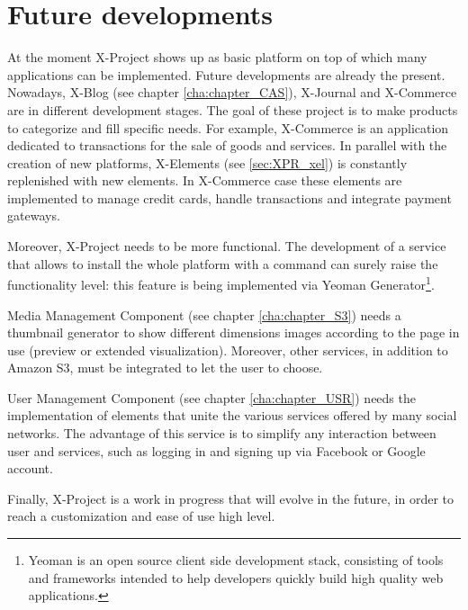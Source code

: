 \section{Future developments}
\label{sec:conclusions_future_developments_a}

At the moment X-Project shows up as basic platform on top of which many applications can be implemented. Future developments are already the present. Nowadays, X-Blog (see chapter \ref{cha:chapter_CAS}), X-Journal and X-Commerce are in different development stages. The goal of these project is to make products to categorize and fill specific needs. For example, X-Commerce is an application dedicated to transactions for the sale of goods and services. In parallel with the creation of new platforms, X-Elements (see \ref{sec:XPR_xel}) is constantly replenished with new elements.
In X-Commerce case these elements are implemented to manage credit cards, handle transactions and integrate payment gateways.

Moreover, X-Project needs to be more functional. The development of a service that allows to install the whole platform with a command can surely raise the functionality level: this feature is being implemented via Yeoman Generator\footnote{Yeoman is an open source client side development stack, consisting of tools and frameworks intended to help developers quickly build high quality web applications.}.

Media Management Component (see chapter \ref{cha:chapter_S3}) needs a thumbnail generator to show different dimensions images according to the page in use (preview or extended visualization). Moreover, other services, in addition to Amazon S3, must be integrated to let the user to choose.

User Management Component (see chapter \ref{cha:chapter_USR}) needs the implementation of elements that unite the various services offered by many social networks. The advantage of this service is to simplify any interaction between user and services, such as logging in and signing up via Facebook or Google account.


Finally, X-Project is a work in progress that will evolve in the future, in order to reach a customization and ease of use high level.
